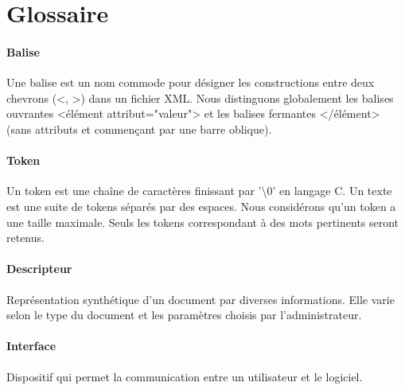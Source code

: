 \documentclass[../main.tex]{subfiles}
\begin{document}
    
    \section{Glossaire}
    \paragraph{Balise}
    Une balise est un nom commode pour désigner les constructions entre deux chevrons (<, >) dans un fichier XML. Nous distinguons globalement les balises ouvrantes <élément attribut="valeur"> et les balises fermantes </élément> (sans attributs et commençant par une barre oblique).

    \paragraph{Token}
    Un token est une chaîne de caractères finissant par '\textbackslash 0' en langage C. Un texte est une suite de tokens séparés par des espaces. Nous considérons qu’un token a une taille maximale. Seuls les tokens correspondant à des mots pertinents seront retenus.

    \paragraph{Descripteur}
    Représentation synthétique d’un document par diverses informations. Elle varie selon le type du document et les paramètres choisis par l’administrateur.

    \paragraph{Interface}
    Dispositif qui permet la communication entre un utilisateur et le logiciel.
\end{document}
